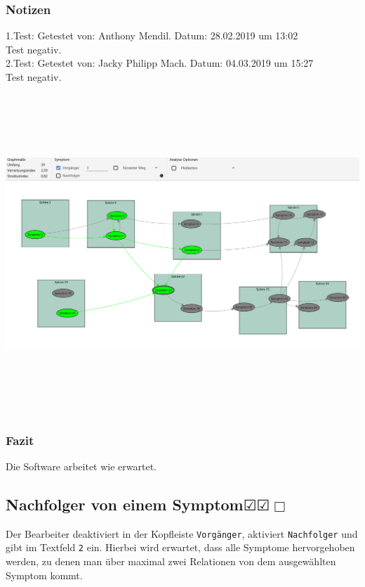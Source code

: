 \documentclass[enabledeprecatedfontcommands]{scrartcl}
\newcommand{\subsectiont}[2]{\subsection[#1]{#1{\normalsize\normalfont #2}}}
\newcommand{\leer}{$\Box$}
\newcommand{\ok}{$\CheckedBox$}
\begin{document}
\subsubsection{Notizen}
1.Test: Getestet von: Anthony Mendil. Datum: 28.02.2019 um 13:02 \\
Test negativ. \\
2.Test: Getestet von: Jacky Philipp Mach. Datum: 04.03.2019 um 15:27 \\
Test negativ.
\begin{center}
\includegraphics[height=12cm, angle=90]{analysevorgaenger.PNG}
\end{center}
\subsubsection{Fazit}
Die Software arbeitet wie erwartet.

\subsectiont{Nachfolger von einem Symptom}{\dotfill\ok\ok\leer}
Der Bearbeiter deaktiviert in der Kopfleiste \texttt{Vorgänger}, aktiviert \texttt{Nachfolger} und gibt im Textfeld \texttt{2} ein. Hierbei wird erwartet, dass alle Symptome hervorgehoben werden, zu denen man über maximal zwei Relationen von dem ausgewählten Symptom kommt. 
\end{document}
